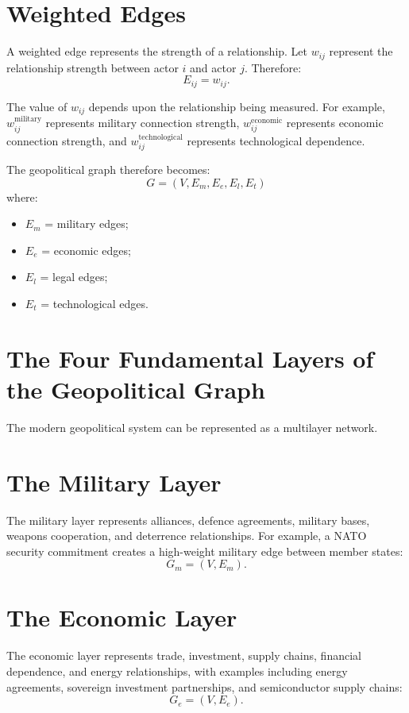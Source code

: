 \documentclass[11pt,openany]{book}
\theoremstyle{plain}
\theoremstyle{definition}
\begin{document}
\section*{Weighted Edges}

A weighted edge represents the strength of a relationship. Let \(w_{ij}\) represent the relationship strength between actor \(i\) and actor \(j\). Therefore:
\[
E_{ij} = w_{ij}.
\]

The value of \(w_{ij}\) depends upon the relationship being measured. For example, \(w_{ij}^{\text{military}}\) represents military connection strength, \(w_{ij}^{\text{economic}}\) represents economic connection strength, and \(w_{ij}^{\text{technological}}\) represents technological dependence.

The geopolitical graph therefore becomes:
\[
G = (V, E_m, E_e, E_l, E_t)
\]
where:
\begin{itemize}
\item \(E_m\) = military edges;
\item \(E_e\) = economic edges;
\item \(E_l\) = legal edges;
\item \(E_t\) = technological edges.
\end{itemize}

\section*{The Four Fundamental Layers of the Geopolitical Graph}

The modern geopolitical system can be represented as a multilayer network.

\section*{The Military Layer}

The military layer represents alliances, defence agreements, military bases, weapons cooperation, and deterrence relationships. For example, a NATO security commitment creates a high-weight military edge between member states:
\[
G_m = (V, E_m).
\]

\section*{The Economic Layer}

The economic layer represents trade, investment, supply chains, financial dependence, and energy relationships, with examples including energy agreements, sovereign investment partnerships, and semiconductor supply chains:
\[
G_e = (V, E_e).
\]
\end{document}
